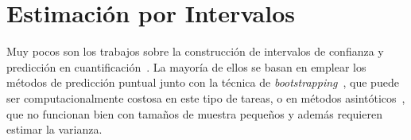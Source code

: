 \chapter{Estimación por Intervalos}\label{intervalos}

Muy pocos son los trabajos sobre la construcción de intervalos de confianza y
predicción en cuantificación~\cite{tasche2019confidence}. La mayoría de ellos se
basan en emplear los métodos de predicción puntual junto con la técnica de {\it
bootstrapping\/}~\cite{hopkins2010method, daughton2020constructing,
daughton2021bootstrapping}, que puede ser computacionalmente costosa en este
tipo de tareas, o en métodos asintóticos~\cite{vaz2019quantification}, que no
funcionan bien con tamaños de muestra pequeños y además requieren estimar la
varianza.
